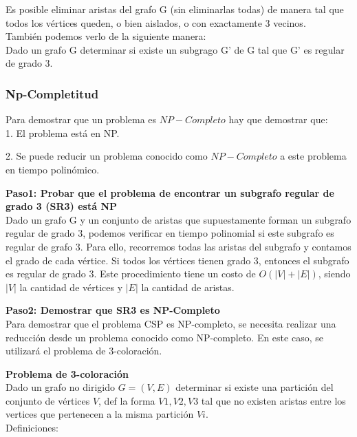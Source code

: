\documentclass[
10pt, %
a4paper, %
oneside, %
headinclude,footinclude, %
BCOR5mm, %
]{scrartcl}
\begin{document}
Es posible eliminar aristas del grafo G (sin eliminarlas todas) de manera tal que todos los vértices queden, o bien aislados, o con exactamente 3 vecinos. \\

También podemos verlo de la siguiente manera: \\

Dado un grafo G determinar si existe un subgrago G' de G tal que G' es regular de grado 3.


\subsubsection{Np-Completitud}

Para demostrar que un problema es $NP-Completo$ hay que demostrar que:\\

1. El problema está en NP.

2. Se puede reducir un problema conocido como $NP-Completo$ a este problema en tiempo polinómico.

\textbf{Paso1: Probar que el problema de encontrar un subgrafo regular de grado 3 (SR3) está NP }\\


Dado un grafo G y un conjunto de aristas que supuestamente forman un subgrafo regular de grado 3, podemos verificar en 
tiempo polinomial si este subgrafo es regular de grafo 3. Para ello, recorremos todas las aristas del subgrafo y contamos el grado de
cada vértice. Si todos los vértices tienen grado 3, entonces el subgrafo es regular de grado 3. Este procedimiento tiene un costo de 
$O(|V|+|E|)$, siendo $|V|$ la cantidad de vértices y $|E|$ la cantidad de aristas.


\textbf{Paso2: Demostrar que SR3 es NP-Completo}\\

Para demostrar que el problema CSP es NP-completo, se necesita realizar una reducción desde un problema conocido como NP-completo. 
En este caso, se utilizará el problema de 3-coloración.


\textbf{ Problema de 3-coloración} \\


Dado un grafo no dirigido $G = (V,E)$ determinar si existe una partición del conjunto de vértices $V$,
def la forma ${V1,V2,V3}$ tal que no existen aristas entre los vertices que pertenecen a la misma partición $Vi$.\\


Definiciones:
\end{document}

